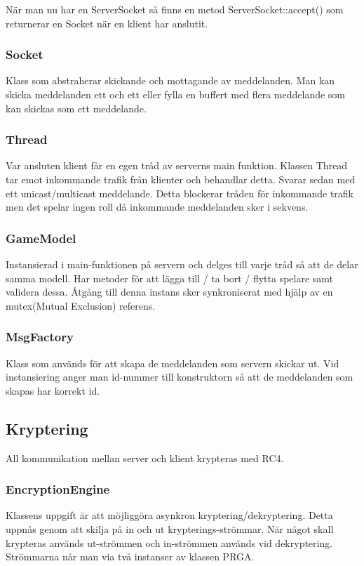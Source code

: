 \documentclass[10pt, titlepage, oneside, a4paper]{article}
\begin{document}
		När man nu har en ServerSocket så finns en metod ServerSocket::accept() som returnerar en Socket när en klient har anslutit.
		\subsubsection{Socket}
		Klass som abstraherar skickande och mottagande av meddelanden. Man kan skicka meddelanden ett och ett eller fylla en buffert med flera meddelande som kan skickas som ett meddelande.
		
		\newpage
		\subsubsection{Thread}
		Var ansluten klient får en egen tråd av serverns main funktion. Klassen Thread tar emot inkommande trafik från klienter och behandlar detta. Svarar sedan med ett unicast/multicast meddelande. Detta blockerar tråden för inkommande trafik men det spelar ingen roll då inkommande meddelanden sker i sekvens.
		
		\subsubsection{GameModel}
		Instansierad i main-funktionen på servern och delges till varje tråd så att de delar samma modell. Har metoder för att lägga till / ta bort / flytta spelare samt validera dessa. Åtgång till denna instans sker synkroniserat med hjälp av en mutex(Mutual Exclusion) referens.
		
		\subsubsection{MsgFactory}
		Klass som används för att skapa de meddelanden som servern skickar ut. Vid instansiering anger man id-nummer till konstruktorn så att de meddelanden som skapas har korrekt id. 
		
		\subsection{Kryptering}
		All kommunikation mellan server och klient krypteras med RC4.
		\subsubsection{EncryptionEngine}
		Klassens uppgift är att möjliggöra asynkron kryptering/dekryptering. Detta uppnås genom att skilja på in och ut krypterings-strömmar. När något skall krypteras används ut-strömmen och in-strömmen används vid dekryptering. Strömmarna når man via två instanser av klassen PRGA. 
		
\end{document}
